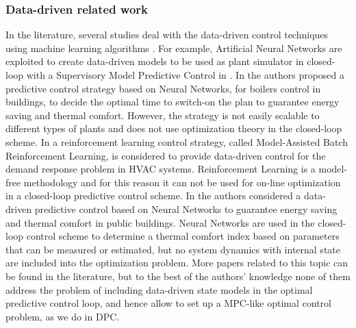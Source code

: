 {\subsubsection{Data-driven related work}\label{SSS:DataDrivenWork}
In the literature, several studies deal with the data-driven control techniques using machine learning algorithms \cite{Hou2013}. For example, Artificial Neural Networks are exploited to create data-driven models to be used as plant simulator in closed-loop with a Supervisory Model Predictive Control in \cite{Afram2017}. In \cite{Macarulla2017} the authors proposed a predictive control strategy based on Neural Networks, for boilers control in buildings, to decide the optimal time to switch-on the plan to guarantee energy saving and thermal comfort. However, the strategy is not easily scalable to different types of plants and does not use optimization theory in the closed-loop scheme. In \cite{Costanzo2016} a reinforcement learning control strategy, called Model-Assisted Batch Reinforcement Learning, is considered to provide data-driven control for the demand response problem in HVAC systems. Reinforcement Learning is a model-free methodology and for this reason it can not be used for on-line optimization in a closed-loop predictive control scheme. In \cite{Ferreira2012} the authors considered a data-driven predictive control based on Neural Networks to guarantee energy saving and  thermal comfort in public buildings. Neural Networks are used in the closed-loop control scheme to determine a thermal comfort index based on parameters that can be measured or estimated, but no  system dynamics with internal state are included into the optimization problem. More papers related to this topic can be found in the literature, but to the best of the authors' knowledge none of them address the problem of including data-driven state models in the optimal predictive control loop, and hence allow to set up a MPC-like optimal control problem, as we do in DPC.
}
